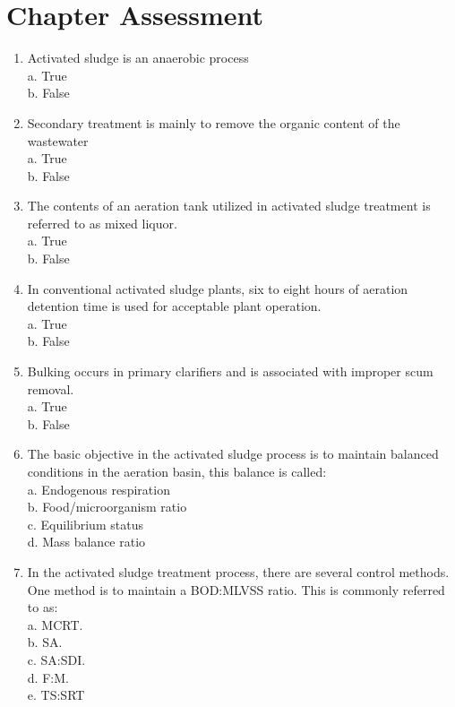 \section*{Chapter Assessment}
\begin{tcolorbox}[breakable, enhanced,
colframe=blue!25,
colback=blue!10,
coltitle=blue!20!black,  
title= Chapter Assessment]

\begin{enumerate}
\item Activated sludge is an anaerobic process \\
a. True \\
b. False \\

\item  Secondary treatment is mainly to remove the organic content of the wastewater \\
a. True \\
b. False \\

\item  The contents of an aeration tank utilized in activated sludge treatment is referred to as mixed liquor. \\
a. True \\
b. False \\

\item  In conventional activated sludge plants, six to eight hours of aeration detention time is used for acceptable plant operation. \\
a. True \\
b. False \\

\item  Bulking occurs in primary clarifiers and is associated with improper scum removal. \\
a. True \\
b. False \\

\item The basic objective in the activated sludge process is to maintain balanced conditions in the aeration basin, this balance is called: \\
a. Endogenous respiration \\
b. Food/microorganism ratio \\
c. Equilibrium status \\
d. Mass balance ratio \\

\item In the activated sludge treatment process, there are several control methods. One method is to maintain a BOD:MLVSS ratio. This is commonly referred to as: \\
a. MCRT. \\
b. SA. \\
c. SA:SDI. \\
d. F:M. \\
e. TS:SRT \\


\end{enumerate}
\end{tcolorbox}
